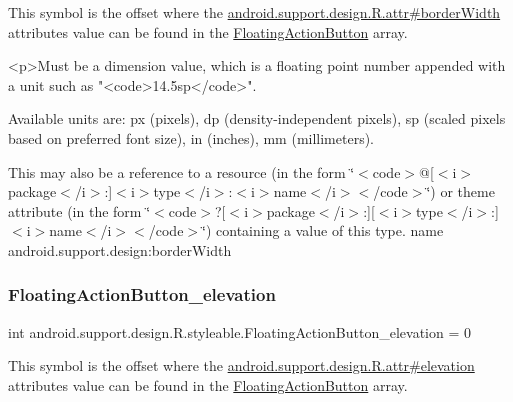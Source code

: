 This symbol is the offset where the \hyperlink{classandroid_1_1support_1_1design_1_1R_1_1attr_a1e35ba7b8eff870ac522092f0026cafc}{android.\+support.\+design.\+R.\+attr\#border\+Width} attribute\textquotesingle{}s value can be found in the \hyperlink{classandroid_1_1support_1_1design_1_1R_1_1styleable_ac39eabec239d50ec950ae5f013825830}{Floating\+Action\+Button} array.

\begin{DoxyVerb}      <p>Must be a dimension value, which is a floating point number appended with a unit such as "<code>14.5sp</code>".
\end{DoxyVerb}
 Available units are\+: px (pixels), dp (density-\/independent pixels), sp (scaled pixels based on preferred font size), in (inches), mm (millimeters). 

This may also be a reference to a resource (in the form \char`\"{}$<$code$>$@\mbox{[}$<$i$>$package$<$/i$>$\+:\mbox{]}$<$i$>$type$<$/i$>$\+:$<$i$>$name$<$/i$>$$<$/code$>$\char`\"{}) or theme attribute (in the form \char`\"{}$<$code$>$?\mbox{[}$<$i$>$package$<$/i$>$\+:\mbox{]}\mbox{[}$<$i$>$type$<$/i$>$\+:\mbox{]}$<$i$>$name$<$/i$>$$<$/code$>$\char`\"{}) containing a value of this type.  name android.\+support.\+design\+:border\+Width \mbox{\label{classandroid_1_1support_1_1design_1_1R_1_1styleable_a6872ef133a4b1a3dea84be25257bd7b1}} 
\subsubsection{\texorpdfstring{Floating\+Action\+Button\+\_\+elevation}{FloatingActionButton\_elevation}}
{\footnotesize\ttfamily int android.\+support.\+design.\+R.\+styleable.\+Floating\+Action\+Button\+\_\+elevation = 0\hspace{0.3cm}{\ttfamily [static]}}

This symbol is the offset where the \hyperlink{classandroid_1_1support_1_1design_1_1R_1_1attr_a5089b576eabe15b5d530b536c68a760d}{android.\+support.\+design.\+R.\+attr\#elevation} attribute\textquotesingle{}s value can be found in the \hyperlink{classandroid_1_1support_1_1design_1_1R_1_1styleable_ac39eabec239d50ec950ae5f013825830}{Floating\+Action\+Button} array.

